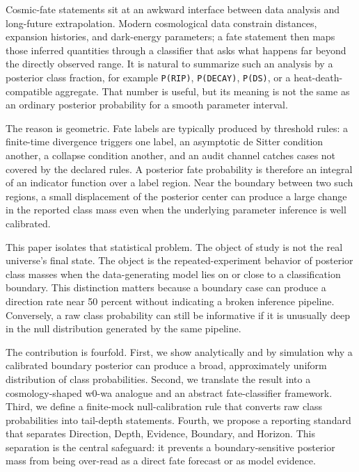\documentclass[
]{article}
\begin{document}
Cosmic-fate statements sit at an awkward interface between data analysis
and long-future extrapolation. Modern cosmological data constrain
distances, expansion histories, and dark-energy parameters; a fate
statement then maps those inferred quantities through a classifier that
asks what happens far beyond the directly observed range. It is natural
to summarize such an analysis by a posterior class fraction, for example
\texttt{P(RIP)}, \texttt{P(DECAY)}, \texttt{P(DS)}, or a
heat-death-compatible aggregate. That number is useful, but its meaning
is not the same as an ordinary posterior probability for a smooth
parameter interval.

The reason is geometric. Fate labels are typically produced by threshold
rules: a finite-time divergence triggers one label, an asymptotic de
Sitter condition another, a collapse condition another, and an audit
channel catches cases not covered by the declared rules. A posterior
fate probability is therefore an integral of an indicator function over
a label region. Near the boundary between two such regions, a small
displacement of the posterior center can produce a large change in the
reported class mass even when the underlying parameter inference is well
calibrated.

This paper isolates that statistical problem. The object of study is not
the real universe's final state. The object is the repeated-experiment
behavior of posterior class masses when the data-generating model lies
on or close to a classification boundary. This distinction matters
because a boundary case can produce a direction rate near 50 percent
without indicating a broken inference pipeline. Conversely, a raw class
probability can still be informative if it is unusually deep in the null
distribution generated by the same pipeline.

The contribution is fourfold. First, we show analytically and by
simulation why a calibrated boundary posterior can produce a broad,
approximately uniform distribution of class probabilities. Second, we
translate the result into a cosmology-shaped w0-wa analogue and an
abstract fate-classifier framework. Third, we define a finite-mock
null-calibration rule that converts raw class probabilities into
tail-depth statements. Fourth, we propose a reporting standard that
separates Direction, Depth, Evidence, Boundary, and Horizon. This
separation is the central safeguard: it prevents a boundary-sensitive
posterior mass from being over-read as a direct fate forecast or as
model evidence.
\end{document}
